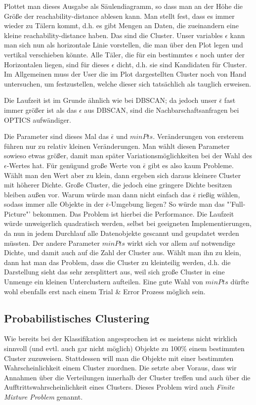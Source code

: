 Plottet man dieses Ausgabe als Säulendiagramm, so dass man an der
Höhe die Größe der reachability-distance ablesen kann. Man stellt fest, dass
es immer wieder zu Tälern kommt, d.h. es gibt Mengen an Daten, die zueinandern 
eine kleine reachability-distance haben. Das sind die Cluster. Unser variables
\(\epsilon\) kann man sich nun als horizontale Linie vorstellen, die man
über den Plot legen und vertikal verschieben könnte. Alle Täler, die für ein
bestimmtes \(\epsilon\) noch unter der Horizontalen liegen, sind für dieses
\(\epsilon\) dicht, d.h. sie sind Kandidaten für Cluster. Im Allgemeinen muss
der User die im Plot dargestellten Cluster noch von Hand untersuchen, um
festzustellen, welche dieser sich tatsächlich als tauglich erweisen.

Die Laufzeit ist im Grunde ähnlich wie bei DBSCAN; da jedoch unser
\(\bar{\epsilon}\) fast immer größer ist als das \(\epsilon\) aus
DBSCAN, sind die Nachbarschaftsanfragen bei OPTICS aufwändiger.

Die Parameter sind dieses Mal das \(\bar{\epsilon}\) und \(minPts\).
Veränderungen von ersterem führen nur zu relativ kleinen Veränderungen.
Man wählt diesen Parameter sowieso etwas größer, damit man später
Variationsmöglichkeiten bei der Wahl des \(\epsilon\)-Wertes hat. Für
genügund große Werte von \(\bar{\epsilon}\) gibt es also kaum Probleme.
Wählt man den Wert aber zu klein, dann ergeben sich daraus kleinere Cluster
mit höherer Dichte. Große Cluster, die jedoch eine gringere Dichte besitzen
bleiben außen vor. Warum würde man dann nicht einfach das \(\bar{\epsilon}\)
rießig wählen, sodass immer alle Objekte in der \(\bar{\epsilon}\)-Umgebung 
liegen? So würde man das "'Full-Picture"' bekommen. Das Problem ist hierbei
die Performance. Die Laufzeit würde unweigerlich quadratisch werden, selbst
bei geeigneten Implementierungen, da nun in jedem Durchlauf alle Datenobjekte
gescannt und geupdatet werden müssten. Der andere Parameter \(minPts\)
wirkt sich vor allem auf notwendige Dichte, und damit auch auf die Zahl der Cluster
aus. Wählt man ihn zu klein, dann hat man das Problem, dass die Cluster zu
kleinteilig werden, d.h. die Darstellung sieht das sehr zersplittert aus, weil sich
große Cluster in eine Unmenge ein kleinen Unterclustern aufteilen. Eine 
gute Wahl von \(minPts\) dürfte wohl ebenfalls erst nach einem Trial \& Error
Prozess möglich sein.

\subsection{Probabilistisches Clustering}
Wie bereits bei der Klassifikation angesprochen ist es meistens nicht wirklich
sinnvoll (und evtl. auch gar nicht möglich) Objekte zu 100\% einem
bestimmten Cluster zuzuweisen. Stattdessen will man die Objekte
mit einer bestimmten Wahrscheinlichkeit einem Cluster zuordnen. Die setzte 
aber Voraus, dass wir Annahmen über die Verteilungen innerhalb der Cluster
treffen und auch über die Aufftrittswahrscheinlichkeit eines Clusters.
Dieses Problem wird auch \textit{Finite Mixture Problem} genannt.

